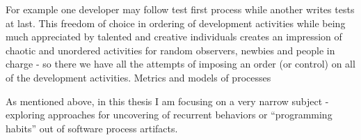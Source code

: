 For example one developer may follow test first process while
another writes tests at last.  This freedom of choice in ordering of development activities 
while being much appreciated by talented and creative individuals creates an impression 
of chaotic and unordered activities for random observers, newbies and people in 
charge - so there we have all the attempts of imposing an order 
(or control) on all of the development activities. Metrics and models of processes


As mentioned above, in this thesis I am focusing on a very narrow subject - exploring approaches
for uncovering of recurrent behaviors or ``programming habits'' out of software process artifacts.








